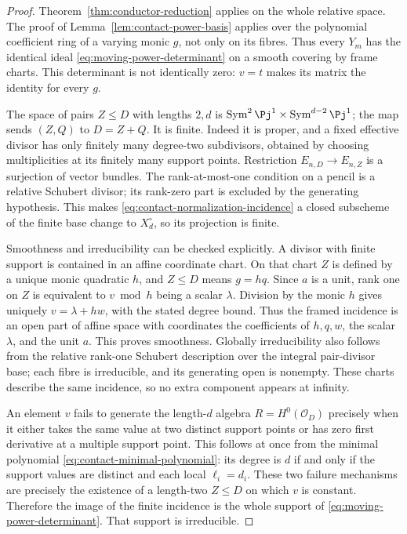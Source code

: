 \begin{proof}
Theorem~\ref{thm:conductor-reduction} applies on the whole relative
space. The proof of Lemma~\ref{lem:contact-power-basis} applies over
the polynomial coefficient ring of a varying monic $g$, not only
on its fibres. Thus every $Y_m$ has the identical ideal
\eqref{eq:moving-power-determinant} on a smooth covering by frame
charts. This determinant is not identically zero: $v=t$ makes its
matrix the identity for every $g$.

The space of pairs $Z\le D$ with lengths $2,d$ is
$\operatorname{Sym}^2\Pj^1\times\operatorname{Sym}^{d-2}\Pj^1$;
the map sends $(Z,Q)$ to $D=Z+Q$. It is finite. Indeed it is proper,
and a fixed effective divisor has only finitely many degree-two
subdivisors, obtained by choosing multiplicities at its finitely
many support points. Restriction $E_{n,D}\to E_{n,Z}$ is a
surjection of vector bundles. The rank-at-most-one condition on a
pencil is a relative Schubert divisor; its rank-zero part is
excluded by the generating hypothesis. This makes
\eqref{eq:contact-normalization-incidence} a closed subscheme of
the finite base change to $X_d^\circ$, so its projection is finite.

Smoothness and irreducibility can be checked explicitly. A divisor
with finite support is contained in an affine coordinate chart. On
that chart $Z$ is defined by a unique monic quadratic $h$, and
$Z\le D$ means $g=hq$. Since $a$ is a unit, rank one on $Z$ is
equivalent to $v\bmod h$ being a scalar $\lambda$. Division by the
monic $h$ gives uniquely $v=\lambda+hw$, with the stated degree
bound. Thus the framed incidence is an open part of affine space
with coordinates the coefficients of $h,q,w$, the scalar $\lambda$,
and the unit $a$. This proves smoothness. Globally irreducibility
also follows from the relative rank-one Schubert description over
the integral pair-divisor base; each fibre is irreducible, and its
generating open is nonempty. These charts describe the same
incidence, so no extra component appears at infinity.

An element $v$ fails to generate the length-$d$ algebra
$R=H^0(\mathcal O_D)$ precisely when it either takes the same value
at two distinct support points or has zero first derivative at a
multiple support point. This follows at once from the minimal
polynomial \eqref{eq:contact-minimal-polynomial}: its degree is $d$
if and only if the support values are distinct and each local
$\ell_i=d_i$. These two failure mechanisms are precisely the
existence of a length-two $Z\le D$ on which $v$ is constant.
Therefore the image of the finite incidence is the whole support
of \eqref{eq:moving-power-determinant}. That support is irreducible.


\end{proof}
